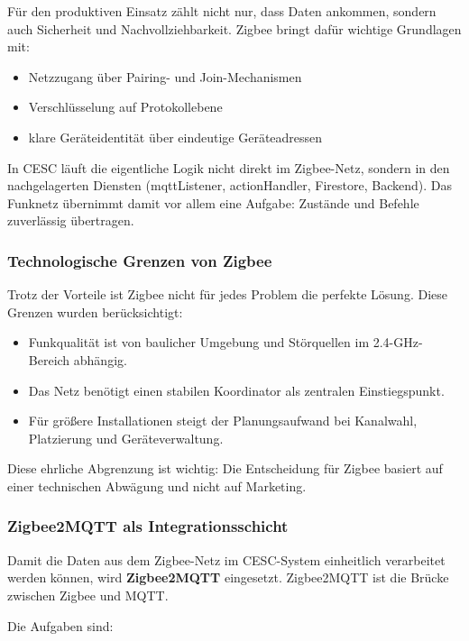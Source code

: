 Für den produktiven Einsatz zählt nicht nur, dass Daten ankommen, sondern auch Sicherheit und Nachvollziehbarkeit. Zigbee bringt dafür wichtige Grundlagen mit:

\begin{itemize}
    \item Netzzugang über Pairing- und Join-Mechanismen
    \item Verschlüsselung auf Protokollebene
    \item klare Geräteidentität über eindeutige Geräteadressen
\end{itemize}

In CESC läuft die eigentliche Logik nicht direkt im Zigbee-Netz, sondern in den nachgelagerten Diensten (mqttListener, actionHandler, Firestore, Backend). Das Funknetz übernimmt damit vor allem eine Aufgabe: Zustände und Befehle zuverlässig übertragen.

\subsubsection{Technologische Grenzen von Zigbee}

Trotz der Vorteile ist Zigbee nicht für jedes Problem die perfekte Lösung. Diese Grenzen wurden berücksichtigt:

\begin{itemize}
    \item Funkqualität ist von baulicher Umgebung und Störquellen im 2.4-GHz-Bereich abhängig.
    \item Das Netz benötigt einen stabilen Koordinator als zentralen Einstiegspunkt.
    \item Für größere Installationen steigt der Planungsaufwand bei Kanalwahl, Platzierung und Geräteverwaltung.
\end{itemize}

Diese ehrliche Abgrenzung ist wichtig: Die Entscheidung für Zigbee basiert auf einer technischen Abwägung und nicht auf Marketing.

\subsubsection{Zigbee2MQTT als Integrationsschicht}

Damit die Daten aus dem Zigbee-Netz im CESC-System einheitlich verarbeitet werden können, wird \textbf{Zigbee2MQTT} eingesetzt. Zigbee2MQTT ist die Brücke zwischen Zigbee und MQTT.

Die Aufgaben sind:

